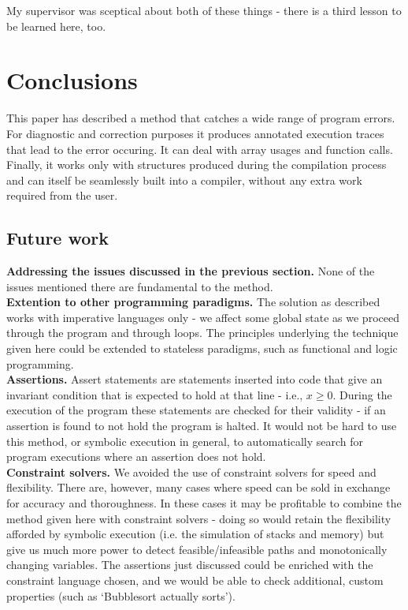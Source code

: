 \documentclass[12pt,a4paper]{article}
\begin{document}
My supervisor was sceptical about both of these things - there is a third lesson to be learned here, too.

\section{Conclusions}
This paper has described a method that catches a wide range of program errors. For diagnostic and correction purposes it produces annotated execution traces that lead
to the error occuring. It can deal with array usages and function calls. Finally, it works only with structures produced during the compilation process
and can itself be seamlessly built into a compiler, without any extra work required from the user. 

\subsection{Future work}
\textbf{Addressing the issues discussed in the previous section.} None of the issues mentioned there are fundamental to the method.\\

\textbf{Extention to other programming paradigms.} The solution as described works with imperative languages only - we affect some global state as we proceed through
the program and through loops. The principles underlying the technique given here could be extended to stateless paradigms, such as functional and logic programming.\\

\textbf{Assertions.} Assert statements are statements inserted into code that give an invariant condition that is expected to hold at that line - i.e., $x \geq 0$.
During the execution of the program these statements are checked for their validity - if an assertion is found to not hold the program is halted. It would not be hard
to use this method, or symbolic execution in general, to automatically search for program executions where an assertion does not hold.\\

\textbf{Constraint solvers.} We avoided the use of constraint solvers for speed and flexibility. There are, however, many cases where speed can be sold in
exchange for accuracy and thoroughness. In these cases it may be profitable to combine the method given here with constraint solvers - doing so would retain the flexibility
afforded by symbolic execution (i.e. the simulation of stacks and memory) but give us much more power to detect feasible/infeasible paths and monotonically changing variables. The assertions just discussed could be enriched with the constraint language chosen, and we would be able to check additional, custom properties (such as
`Bubblesort actually sorts').\\
\end{document}
